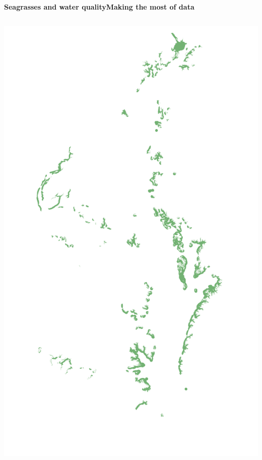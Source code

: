 \documentclass[serif]{beamer}\usepackage[]{graphicx}\usepackage[]{color}
\begin{document}
\begin{frame}{\textbf{Seagrasses and water quality}}{\textbf{Making the most of data}}
\begin{columns}
\begin{column}{0.3\textwidth}
\centerline{\includegraphics[width = \textwidth]{fig/cb_sea.pdf}}
\end{column}
\end{columns}
\end{frame}
\end{document}
